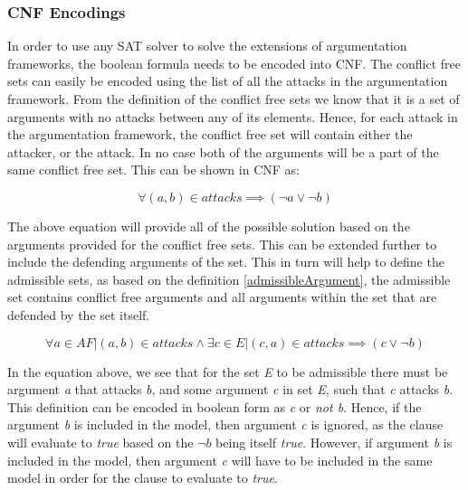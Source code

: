 \subsubsection{CNF Encodings}
In order to use any SAT solver to solve the extensions of argumentation frameworks, the boolean formula needs to be encoded into CNF. The conflict free sets can easily be encoded using the list of all the attacks in the argumentation framework. From the definition of the conflict free sets we know that it is a set of arguments with no attacks between any of its elements. Hence, for each attack in the argumentation framework, the conflict free set will contain either the attacker, or the attack. In no case both of the arguments will be a part of the same conflict free set. This can be shown in CNF as:

\begin{equation}
	  \forall (a,b) \in attacks \implies (\neg a \lor \neg b)
\end{equation}

The above equation will provide all of the possible solution based on the arguments provided for the conflict free sets. This can be extended further to include the defending arguments of the set. This in turn will help to define the admissible sets, as based on the definition \ref{admissibleArgument}, the admissible set contains conflict free arguments and all arguments within the set that are defended by the set itself.

\begin{equation}
\forall a \in AF | (a,b) \in attacks \land \exists c \in E | (c,a) \in attacks \implies (c \lor \neg b)
\end{equation}

In the equation above, we see that for the set \textit{E} to be admissible there must be argument \textit{a} that attacks \textit{b}, and some argument \textit{c} in set \textit{E}, such that \textit{c} attacks \textit{b}. This definition can be encoded in boolean form as \textit{c} or \textit{not b}. Hence, if the argument \textit{b} is included in the model, then argument \textit{c} is ignored, as the clause will evaluate to \textit{true} based on the $\neg b$ being itself \textit{true}. However, if argument \textit{b} is included in the model, then argument \textit{c} will have to be included in the same model in order for the clause to evaluate to \textit{true}.